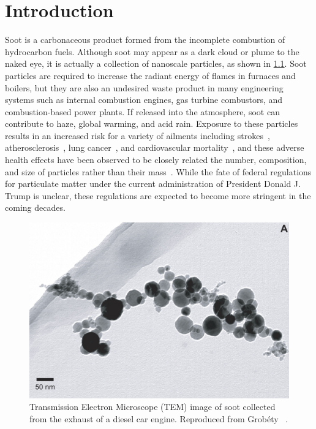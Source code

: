 \chapter{Introduction\label{ch:intro}}
 
Soot is a carbonaceous product formed from the incomplete combustion of hydrocarbon fuels. Although soot may appear as a dark cloud or plume to the naked eye, it is actually a collection of nanoscale particles, as shown in \cref{fig:intro:dieselsoot}. Soot particles are required to increase the radiant energy of flames in furnaces and boilers, but they are also an undesired waste product in many engineering systems such as internal combustion engines, gas turbine combustors, and combustion-based power plants. If released into the atmosphere, soot can contribute to haze, global warming, and acid rain. Exposure to these particles results in an increased risk for a variety of ailments including strokes~\cite{popeiii2006}, atherosclerosis~\cite{polichetti2009,kennedy2007,popeiii2006}, lung cancer~\cite{kennedy2007,popeiii2006}, and cardiovascular mortality~\cite{polichetti2009,kennedy2007,popeiii2006}, and these adverse health effects have been observed to be closely related the number, composition, and size of particles rather than their mass~\cite{seaton1995,lighty2000}. While the fate of federal regulations for particulate matter under the current administration of President Donald J. Trump is unclear, these regulations are expected to become more stringent in the coming decades. 

\begin{figure}[htb]
  \centering
  \includegraphics[width=0.4\linewidth]{ch-intro/figures/diesel-soot}
  \caption[Soot From Diesel Car Engine]{Transmission Electron Microscope (TEM) image of soot collected from the exhaust of a diesel car engine. Reproduced from Grob\'ety \etal~\cite{grobety2010}.}
  \label{fig:intro:dieselsoot}
\end{figure}

